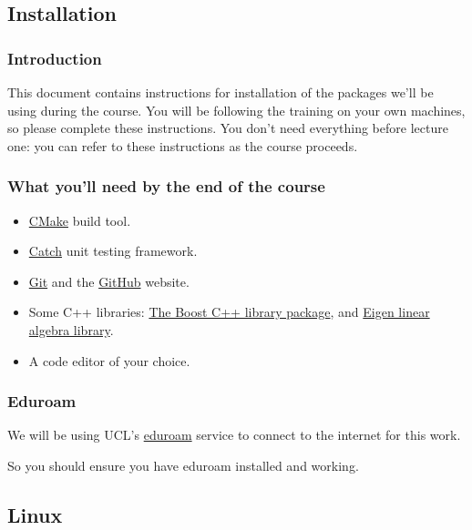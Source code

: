 \subsection{Installation}\label{installation-1}

\subsubsection{Introduction}\label{introduction-6}

This document contains instructions for installation of the packages
we'll be using during the course. You will be following the training on
your own machines, so please complete these instructions. You don't need
everything before lecture one: you can refer to these instructions as
the course proceeds.

\subsubsection{What you'll need by the end of the
course}\label{what-youll-need-by-the-end-of-the-course}

\begin{itemize}
\itemsep1pt\parskip0pt
\item
  \href{http://www.cmake.org}{CMake} build tool.
\item
  \href{https://github.com/philsquared/Catch}{Catch} unit testing
  framework.
\item
  \href{https://git-scm.com/}{Git} and the
  \href{https://github.com/}{GitHub} website.
\item
  Some C++ libraries: \href{http://www.boost.org/}{The Boost C++ library
  package}, and
  \href{http://eigen.tuxfamily.org/index.php?title=Main_Page}{Eigen
  linear algebra library}.
\item
  A code editor of your choice.
\end{itemize}

\subsubsection{Eduroam}\label{eduroam}

We will be using UCL's
\href{http://www.ucl.ac.uk/isd/staff/wireless/eduroam}{eduroam} service
to connect to the internet for this work.

So you should ensure you have eduroam installed and working.

\subsection{Linux}\label{linux}

